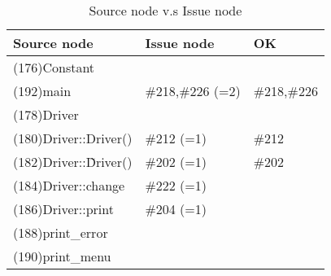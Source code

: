 \begin{table}[hb]
\begin{center}
\begin{tabular}{|l|l|l|}
\hline
Source node & Issue node & OK \\
\hline
(176)Constant & & \\
(192)main & \#218,\#226 (=2) & \#218,\#226\\
(178)Driver & &\\
(180)Driver::Driver() & \#212 (=1) & \#212\\
(182)Driver::\~Driver() & \#202 (=1) & \#202\\
(184)Driver::change & \#222 (=1) &\\
(186)Driver::print & \#204 (=1) &\\
(188)print\_error & &\\
(190)print\_menu & & \\
\hline
\end{tabular}
\caption{Source node v.s Issue node}
\end{center}
\end{table}

